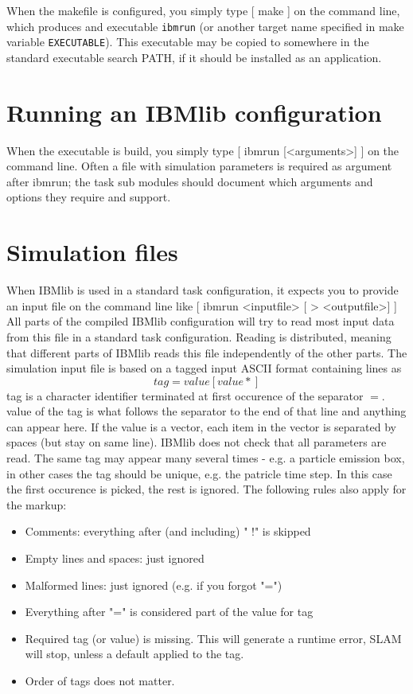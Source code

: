 When the makefile is configured, you simply type
[ make
]
on the command line, which produces and executable {\tt ibmrun} 
(or another target name specified in make variable {\tt EXECUTABLE}).
This executable may be copied to somewhere in the standard executable search PATH, if
it should be installed as an application.

\section{Running an IBMlib configuration}

When the executable is build, you simply type
[ ibmrun [<arguments>]
]
on the command line. Often a file with simulation parameters is required 
as argument after ibmrun; the task sub modules should document which arguments 
and options they require and support.

\section{Simulation files}

When IBMlib is used in a standard task configuration, it expects you 
to provide an input file on the command line like
[ ibmrun <inputfile> [ >  <outputfile>]
]
All parts of the compiled IBMlib configuration will try to 
read most input data from this file in a standard task configuration.
Reading is distributed, meaning that different parts of IBMlib
reads this file independently of the other parts.
The simulation input file is based on
a tagged input ASCII format containing lines as 
\begin{equation}
tag = value [value*] \nonumber
\end{equation}
tag is a character identifier terminated at first occurence of 
the separator $=$. value of the tag is what follows the separator to the end of that 
line and anything can appear here. If the value is a vector, each item in the vector
is separated by spaces (but stay on same line).
IBMlib does not check that all parameters are read.
The same tag may appear many several times - e.g. a particle emission box,
in other cases the tag should be unique, e.g. the patricle time step. In this case
the first occurence is picked, the rest is ignored.
The following rules also apply for the markup:
\begin{itemize}
  \item Comments: everything after (and including) " !" is skipped
  \item Empty lines and spaces:   just ignored
  \item Malformed lines: just ignored (e.g. if you forgot "=")
  \item Everything after "=" is considered part of the value for tag
  \item Required tag (or value) is missing. This will generate a runtime
        error, SLAM will stop, unless a default applied to the tag.
  \item Order of tags does not matter. 
\end{itemize}  

